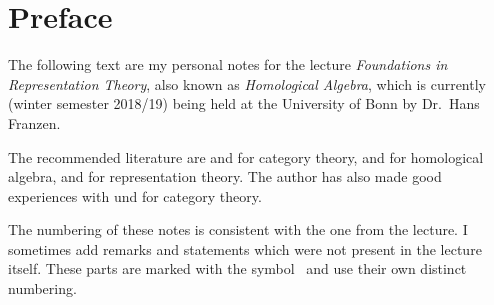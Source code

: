 \chapter{Preface}

The following text are my personal notes for the lecture \emph{Foundations in Representation Theory}, also known as \emph{Homological Algebra}, which is currently (winter semester 2018/19) being held at the University of Bonn by Dr.\ Hans Franzen.

The recommended literature are \cite{Working} and \cite{Schubert} for category theory, \cite[Chapter~1]{SheavesManifolds} and \cite{Weibel} for homological algebra, and \cite{Elements} for representation theory.
The author has also made good experiences with \cite{BasicCategory} und \cite{Brandenburg} for category theory.

The numbering of these notes is consistent with the one from the lecture.
I sometimes add remarks and statements which were not present in the lecture itself.
These parts are marked with the symbol~\textsuperscript{\extrasymbol} and use their own distinct numbering.




